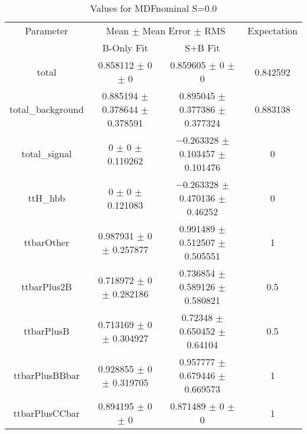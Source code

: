 \begin{table}
\centering
\caption{Values for MDFnominal S=0.0}
\begin{tabular}{cccc}
\toprule
Parameter & \multicolumn{2}{c}{Mean $\pm$ Mean Error $\pm$ RMS} & Expectation\\
 & B-Only Fit & S+B Fit & \\
\midrule
total & \num{0.858112} $\pm$ \num{0} $\pm$ \num{0} & \num{0.859605} $\pm$ \num{0} $\pm$ \num{0} & \num{0.842592}\\
total\_background & \num{0.885194} $\pm$ \num{0.378644} $\pm$ \num{0.378591} & \num{0.895045} $\pm$ \num{0.377386} $\pm$ \num{0.377324} & \num{0.883138}\\
total\_signal & \num{0} $\pm$ \num{0} $\pm$ \num{0.110262} & \num{-0.263328} $\pm$ \num{0.103457} $\pm$ \num{0.101476} & \num{0}\\
ttH\_hbb & \num{0} $\pm$ \num{0} $\pm$ \num{0.121083} & \num{-0.263328} $\pm$ \num{0.470136} $\pm$ \num{0.46252} & \num{0}\\
ttbarOther & \num{0.987931} $\pm$ \num{0} $\pm$ \num{0.257877} & \num{0.991489} $\pm$ \num{0.512507} $\pm$ \num{0.505551} & \num{1}\\
ttbarPlus2B & \num{0.718972} $\pm$ \num{0} $\pm$ \num{0.282186} & \num{0.736854} $\pm$ \num{0.589126} $\pm$ \num{0.580821} & \num{0.5}\\
ttbarPlusB & \num{0.713169} $\pm$ \num{0} $\pm$ \num{0.304927} & \num{0.72348} $\pm$ \num{0.650452} $\pm$ \num{0.64104} & \num{0.5}\\
ttbarPlusBBbar & \num{0.928855} $\pm$ \num{0} $\pm$ \num{0.319705} & \num{0.957777} $\pm$ \num{0.679446} $\pm$ \num{0.669573} & \num{1}\\
ttbarPlusCCbar & \num{0.894195} $\pm$ \num{0} $\pm$ \num{0} & \num{0.871489} $\pm$ \num{0} $\pm$ \num{0} & \num{1}\\
\bottomrule
\end{tabular}
\end{table}